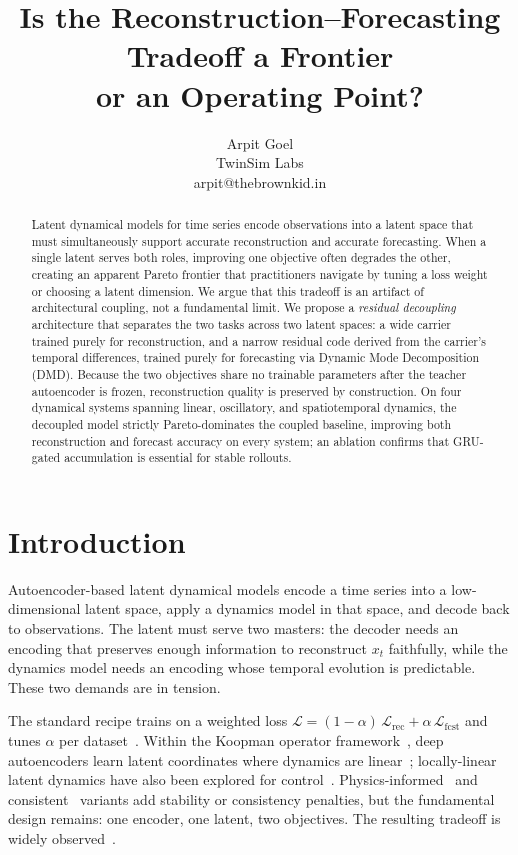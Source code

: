 \documentclass{article}
\title{Is the Reconstruction--Forecasting Tradeoff a Frontier\\or an Operating Point?}
\author{Arpit Goel\\ TwinSim Labs \\ arpit@thebrownkid.in}
\begin{document}
\maketitle

\begin{abstract}
Latent dynamical models for time series encode observations into a latent space
that must simultaneously support accurate reconstruction and accurate
forecasting.  When a single latent serves both roles, improving one objective
often degrades the other, creating an apparent Pareto frontier that practitioners
navigate by tuning a loss weight or choosing a latent dimension.  We argue that
this tradeoff is an artifact of architectural coupling, not a fundamental limit.
We propose a \emph{residual decoupling} architecture that separates the two
tasks across two latent spaces: a wide carrier trained purely for reconstruction,
and a narrow residual code derived from the carrier's temporal differences,
trained purely for forecasting via Dynamic Mode Decomposition (DMD).  Because the
two objectives share no trainable parameters after the teacher autoencoder is
frozen, reconstruction quality is preserved by construction.  On four dynamical
systems spanning linear, oscillatory, and spatiotemporal dynamics, the decoupled
model strictly Pareto-dominates the coupled baseline, improving both reconstruction
and forecast accuracy on every system; an ablation confirms that GRU-gated
accumulation is essential for stable rollouts.
\end{abstract}


\section{Introduction}

Autoencoder-based latent dynamical models encode a time series into a
low-dimensional latent space, apply a dynamics model in that space, and decode
back to observations.  The latent must serve two masters: the decoder needs an
encoding that preserves enough information to reconstruct $x_t$ faithfully,
while the dynamics model needs an encoding whose temporal evolution is
predictable.  These two demands are in tension.

The standard recipe trains on a weighted loss
$\mathcal{L} = (1-\alpha)\,\mathcal{L}_{\mathrm{rec}} + \alpha\,\mathcal{L}_{\mathrm{fcst}}$
and tunes $\alpha$ per
dataset~\citep{lusch2018deep,takeishi2017learning,otto2019linearly}.
Within the Koopman operator
framework~\citep{brunton2022modern,bevanda2021koopman}, deep autoencoders
learn latent coordinates where dynamics are
linear~\citep{yeung2019learning,champion2019data,gin2021deep};
locally-linear latent dynamics have also been explored for
control~\citep{watter2015embed}.
Physics-informed~\citep{erichson2019} and
consistent~\citep{azencot2020} variants add stability or consistency
penalties, but the fundamental design remains: one encoder, one latent, two
objectives.  The resulting tradeoff is widely
observed~\citep{cai2023hyvae,sener2018multi}.
\end{document}
